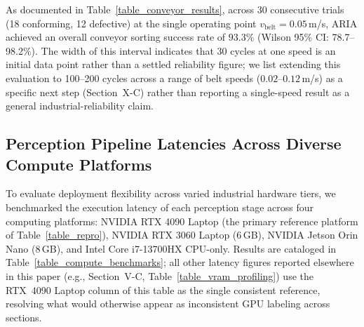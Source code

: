 \documentclass[journal]{IEEEtran}
\begin{document}
\begin{table}[!t]
\centering
\caption{Industrial Moving Conveyor Sorting Validation Across 30 Continuous Cycles ($v_{\text{belt}} = 0.05$\,m/s), with Wilson 95\% Confidence Intervals}
\label{table_conveyor_results}
\footnotesize
{}
\end{table}

As documented in Table~\ref{table_conveyor_results}, across 30 consecutive trials (18 conforming, 12 defective) at the single operating point $v_{\text{belt}}=0.05$\,m/s, ARIA achieved an overall conveyor sorting success rate of $93.3\%$ (Wilson 95\% CI: 78.7--98.2\%). The width of this interval indicates that 30 cycles at one speed is an initial data point rather than a settled reliability figure; we list extending this evaluation to 100--200 cycles across a range of belt speeds ($0.02$--$0.12$\,m/s) as a specific next step (Section~X-C) rather than reporting a single-speed result as a general industrial-reliability claim.

\subsection{Perception Pipeline Latencies Across Diverse Compute Platforms}
To evaluate deployment flexibility across varied industrial hardware tiers, we benchmarked the execution latency of each perception stage across four computing platforms: NVIDIA RTX 4090 Laptop (the primary reference platform of Table~\ref{table_repro}), NVIDIA RTX 3060 Laptop (6\,GB), NVIDIA Jetson Orin Nano (8\,GB), and Intel Core i7-13700HX CPU-only. Results are cataloged in Table~\ref{table_compute_benchmarks}; all other latency figures reported elsewhere in this paper (e.g., Section~V-C, Table~\ref{table_vram_profiling}) use the RTX~4090 Laptop column of this table as the single consistent reference, resolving what would otherwise appear as inconsistent GPU labeling across sections.
\end{document}
